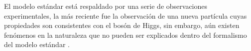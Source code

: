 
El modelo estándar está respaldado por una serie de observaciones experimentales, la más reciente fue la observación de una nueva partícula cuyas propiedades son consistentes con el bosón de Higgs, sin embargo, aún existen fenómenos en la naturaleza que no pueden ser explicados dentro del formalismo del modelo estándar%
.



